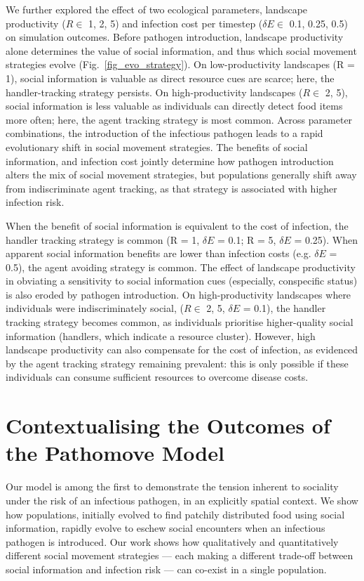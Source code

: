 We further explored the effect of two ecological parameters, landscape productivity ($R \in $ 1, 2, 5) and infection cost per timestep ($\delta E \in$ 0.1, 0.25, 0.5) on simulation outcomes.
Before pathogen introduction, landscape productivity alone determines the value of social information, and thus which social movement strategies evolve (Fig.~\ref{fig_evo_strategy}).
On low-productivity landscapes (R = 1), social information is valuable as direct resource cues are scarce; here, the handler-tracking strategy persists.
On high-productivity landscapes ($R \in$ 2, 5), social information is less valuable as individuals can directly detect food items more often; here, the agent tracking strategy is most common.
Across parameter combinations, the introduction of the infectious pathogen leads to a rapid evolutionary shift in social movement strategies.
The benefits of social information, and infection cost jointly determine how pathogen introduction alters the mix of social movement strategies, but populations generally shift away from indiscriminate agent tracking, as that strategy is associated with higher infection risk.

When the benefit of social information is equivalent to the cost of infection, the handler tracking strategy is common (R = 1, $\delta E$ = 0.1; R = 5, $\delta E$ = 0.25).
When apparent social information benefits are lower than infection costs (e.g. $\delta E$ = 0.5), the agent avoiding strategy is common.
The effect of landscape productivity in obviating a sensitivity to social information cues (especially, conspecific status) is also eroded by pathogen introduction.
On high-productivity landscapes where individuals were indiscriminately social, ($R \in$ 2, 5, $\delta E$ = 0.1), the handler tracking strategy becomes common, as individuals prioritise higher-quality social information (handlers, which indicate a resource cluster).
However, high landscape productivity can also compensate for the cost of infection, as evidenced by the agent tracking strategy remaining prevalent: this is only possible if these individuals can consume sufficient resources to overcome disease costs.

\section*{Contextualising the Outcomes of the Pathomove Model}

Our model is among the first to demonstrate the tension inherent to sociality under the risk of an infectious pathogen, in an explicitly spatial context.
We show how populations, initially evolved to find patchily distributed food using social information, rapidly evolve to eschew social encounters when an infectious pathogen is introduced.
Our work shows how qualitatively and quantitatively different social movement strategies --- each making a different trade-off between social information and infection risk --- can co-exist in a single population.

